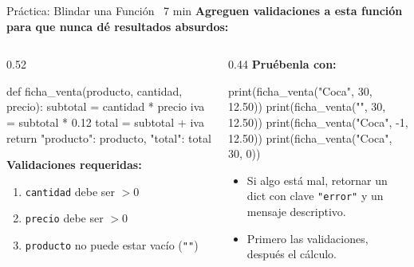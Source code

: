 \documentclass[aspectratio=169, 11pt]{beamer}
\begin{document}
\begin{frame}[fragile,shrink=28]{Práctica: Blindar una Función \hfill
    {\normalsize\color{arcaRed}\faClock\ 7 min}}
  \vspace{-6pt}
  {\footnotesize\color{arcaDark}\bfseries
    Agreguen validaciones a esta función para que nunca
    dé resultados absurdos:}

  \vspace{4pt}
  \begin{columns}[T]
    \begin{column}{0.52\textwidth}
      \begin{pyblock}
def ficha_venta(producto, cantidad, precio):
    subtotal = cantidad * precio
    iva = subtotal * 0.12
    total = subtotal + iva
    return {
        "producto": producto,
        "total": total
    }
      \end{pyblock}

      \vspace{2pt}
      {\footnotesize\color{arcaDark}\bfseries Validaciones requeridas:}
      {\footnotesize
      \begin{enumerate}\setlength{\itemsep}{2pt}
        \item \texttt{cantidad} debe ser $> 0$
        \item \texttt{precio} debe ser $> 0$
        \item \texttt{producto} no puede estar vacío
              (\texttt{""})
      \end{enumerate}
      }
    \end{column}

    \begin{column}{0.44\textwidth}
      {\scriptsize\color{textMuted}\bfseries Pruébenla con:}
      \begin{pyblock}
print(ficha_venta("Coca", 30, 12.50))
print(ficha_venta("", 30, 12.50))
print(ficha_venta("Coca", -1, 12.50))
print(ficha_venta("Coca", 30, 0))
      \end{pyblock}

      \vspace{4pt}
      {\scriptsize\color{textMuted}
      \begin{itemize}\setlength{\itemsep}{3pt}
        \item[{\color{arcaRed}\scriptsize\faArrowRight}]
          Si algo está mal, retornar un dict
          con clave \texttt{"error"}
          y un mensaje descriptivo.
        \item[{\color{arcaRed}\scriptsize\faLightbulb}]
          Primero las validaciones,
          después el cálculo.
      \end{itemize}
      }
    \end{column}
  \end{columns}
\end{frame}
\end{document}
